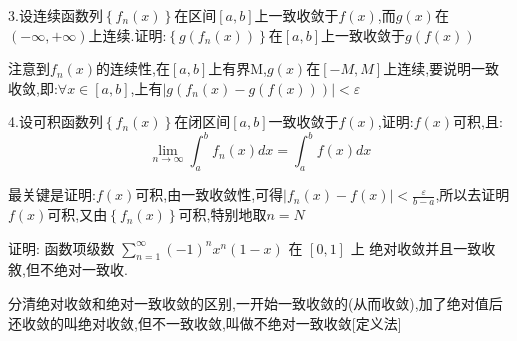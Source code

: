 \documentclass{ctexart}
\begin{document}
\begin{tcolorbox}[title = {综合性问题及其思路,无解析答案},colbacktitle=red!25!white,colback=white,arc = 2mm, outer arc = 2mm,fonttitle = \itshape, fontupper = \itshape, fontlower = \itshape]
	3.设连续函数列$\left\{f_{n}(x)\right\}$在区间$\left[a,b\right]$上一致收敛于$f(x)$,而$g(x)$在$\left(-\infty,+\infty \right)$上连续.证明:$\left\{g(f_{n}(x)) \right\}$在$\left[a,b\right]$上一致收敛于$g(f(x))$
		\begin{tcolorbox}[colback=white,arc = 1mm, outer arc = 1mm,fonttitle = \itshape, fontupper = \itshape, fontlower = \itshape]
		{\color{red}注意到$f_{n}(x)$的连续性,在$\left[a,b\right]$上有界M,$g(x)$在$\left[-M,M \right]$上连续,要说明一致收敛,即:$\forall x \in [a,b]$,上有$\left|g(f_{n}(x)-g(f(x)))\right| < \varepsilon$}
		\tcblower
		\vspace{240pt}
	\end{tcolorbox}
  4.设可积函数列$\left\{f_{n}(x)\right\}$在闭区间$\left[a,b\right]$一致收敛于$f(x)$,证明:$f(x)$可积,且:
  $$\lim_{n \to \infty}\int_{a}^{b}f_{n}(x)dx=\int_{a}^{b}f(x)dx$$
		\begin{tcolorbox}[colback=white,arc = 1mm, outer arc = 1mm,fonttitle = \itshape, fontupper = \itshape, fontlower = \itshape]
	{\color{red}最关键是证明:$f(x)$可积,由一致收敛性,可得$\displaystyle{\left|f_{n}(x)-f(x)\right|< \frac{\varepsilon}{b-a}}$,所以去证明$f(x)$可积,又由$\left\{f_{n}(x)\right\}$可积,特别地取$n=N$}
	\tcblower
	\vspace{240pt}

\end{tcolorbox}
\end{tcolorbox}
\begin{tcolorbox}[title = {综合性问题及其思路,无解析答案},colbacktitle=red!25!white,colback=white,arc = 2mm, outer arc = 2mm,fonttitle = \itshape, fontupper = \itshape, fontlower = \itshape]
	 证明: 函数项级数 $\sum\limits_{n=1}^{\infty}(-1)^{n} x^{n}(1-x)$ 在 $[0,1]$ 上 绝对收敛并且一致收敘,但不绝对一致收.
			\begin{tcolorbox}[colback=white,arc = 1mm, outer arc = 1mm,fonttitle = \itshape, fontupper = \itshape, fontlower = \itshape]
		{\color{red}分清绝对收敛和绝对一致收敛的区别,一开始一致收敛的(从而收敛),加了绝对值后还收敛的叫绝对收敛,但不一致收敛,叫做不绝对一致收敛[定义法]}
	 
		\vspace{240pt}
		
	\end{tcolorbox}
\end{tcolorbox}
\end{document}

